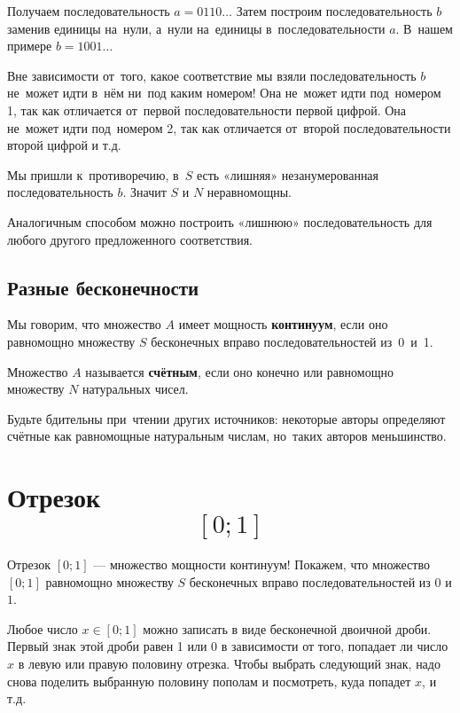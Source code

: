 \documentclass[12pt, a4paper]{article}
\begin{document}
Получаем последовательность $a=0110\ldots$ Затем построим последовательность $b$ заменив единицы на~нули, а~нули на~единицы в~последовательности $a$. В~нашем примере $b=1001\ldots $

Вне зависимости от~того, какое соответствие мы взяли  последовательность $b$ не~может идти в~нём ни~под каким номером! Она не~может идти под~номером 1, так как отличается от~первой последовательности первой цифрой. Она не~может идти под~номером 2, так как отличается от~второй последовательности второй цифрой и т.д.

Мы пришли к~противоречию, в~$S$ есть «лишняя» незанумерованная последовательность $b$. Значит $S$ и $N$ неравномощны.

Аналогичным способом можно построить «лишнюю» последовательность для любого другого предложенного соответствия.

\subsection{Разные бесконечности}

Мы говорим, что множество $A$ имеет мощность \textbf{континуум}, если оно равномощно множеству $S$ бесконечных вправо последовательностей из~0~и~1.


Множество $A$ называется \textbf{счётным}, если оно конечно или равномощно множеству $N$ натуральных чисел.

Будьте бдительны при~чтении других источников: некоторые авторы определяют счётные как равномощные натуральным числам, но~таких авторов меньшинство.

\section{Отрезок \[ [0;1] \]}

Отрезок $[0;1]$ --- множество мощности континуум!
Покажем, что множество $[0;1]$ равномощно множеству $S$ бесконечных вправо последовательностей из $0$ и $1$.

Любое число $x \in [0;1]$ можно записать в виде бесконечной двоичной дроби. Первый знак этой дроби равен 1 или 0 в зависимости от того, попадает ли число $x$ в левую или правую половину отрезка. Чтобы выбрать следующий знак, надо снова поделить выбранную половину пополам и посмотреть, куда попадет $x$, и т.д.
\end{document}
